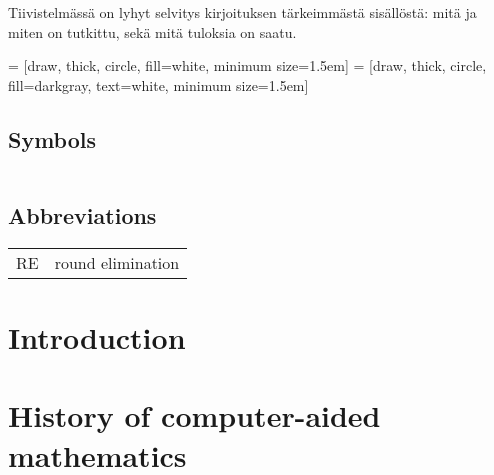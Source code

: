 \documentclass[english, 12pt, a4paper, sci, a-1b, online]{aaltothesis}
\date{2021}
\begin{document}
\makecoverpage{}

\makecopyrightpage{}

\begin{abstractpage}[english]
  \abstracttext{}
\end{abstractpage}

\newpage


\begin{abstractpage}[finnish]
  Tiivistelmässä on lyhyt selvitys
  kirjoituksen tärkeimmästä sisällöstä: mitä ja miten on tutkittu,
  sekä mitä tuloksia on saatu. 
\end{abstractpage}

\thesistableofcontents{}



\newcommand{\reline}[1]{\textbf{#1}}

 = [draw, thick, circle, fill=white, minimum size=1.5em]
 = [draw, thick, circle, fill=darkgray, text=white, minimum size=1.5em]

\subsection*{Symbols}

\begin{tabular}{ll}
\end{tabular}

\subsection*{Abbreviations}

\begin{tabular}{ll}
RE         & round elimination
\end{tabular}

\cleardoublepage{}
\section{Introduction}

\thispagestyle{empty}

\clearpage
\section{History of computer-aided mathematics}
\end{document}
